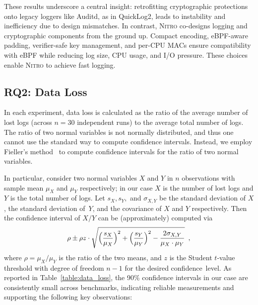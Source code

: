 \documentclass[sigconf]{sty/acmart}
\newcommand{\Sys}{\mbox{\textsc{Nitro}}\xspace}
\newcommand{\qltwo}{QuickLog2\xspace}
\begin{document}
These results underscore a central insight: retrofitting cryptographic protections onto legacy loggers like Auditd, as in \qltwo, leads to instability and inefficiency due to design mismatches. In contrast, \Sys co-designs logging and cryptographic components from the ground up. Compact encoding, eBPF-aware padding, verifier-safe key management, and per-CPU MACs ensure compatibility with eBPF while reducing log size, CPU usage, and I/O pressure. These choices enable \Sys to achieve fast logging.



\subsection{RQ2: Data Loss}
\label{sub:data_loss}


In each experiment, data loss is calculated as the ratio of the average number of lost logs (across $n = 30$ independent runs) to the average total number of logs.
The ratio of two normal variables is not normally distributed, and thus one cannot use the standard way to compute confidence intervals. 
Instead, we employ Fieller's method~\cite{Fielle} to compute confidence intervals for the ratio of two normal variables. 

In particular, consider two normal variables $X$ and $Y$ in $n$ observations with sample mean $\mu_X$ and $\mu_Y$ respectively; 
in our case $X$ is the number of lost logs and $Y$ is the total number of logs. 
Let $s_X, s_Y,$ and $\sigma_{X, Y}$ be the standard deviation of $X$, 
the standard deviation of~$Y$, and the covariance of $X$ and $Y$ respectively. 
Then the confidence interval of $X / Y$ can be (approximately) computed via
\[
\rho \pm \rho z \cdot  \sqrt{ \Bigl( \frac{s_X}{\mu_X} \Bigr)^2+ \Bigl( \frac{s_Y}{\mu_Y} \Bigr)^2 - \frac{2\sigma_{X, Y}}{\mu_X \cdot \mu_Y}}   \enspace, 
\]
where $\rho = \mu_X / \mu_Y$ is  the ratio of the two means, 
and $z$ is the Student $t$-value threshold with degree of freedom $n - 1$ for the desired confidence~level. 
As reported in Table~\ref{table:data_loss}, the 90\% confidence intervals in our case are consistently small across benchmarks, indicating reliable measurements and supporting the following key observations:
\end{document}
